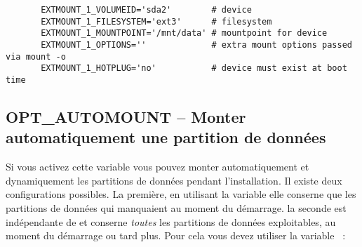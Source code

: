 \begin{example}
\begin{verbatim}
       EXTMOUNT_1_VOLUMEID='sda2'        # device
       EXTMOUNT_1_FILESYSTEM='ext3'      # filesystem
       EXTMOUNT_1_MOUNTPOINT='/mnt/data' # mountpoint for device
       EXTMOUNT_1_OPTIONS=''             # extra mount options passed via mount -o
       EXTMOUNT_1_HOTPLUG='no'           # device must exist at boot time
\end{verbatim}
\end{example}


\subsection {OPT\_AUTOMOUNT -- Monter automatiquement une partition de données}

    Si vous activez cette variable  vous pouvez monter
	automatiquement et dynamiquement les partitions de données pendant l'installation.
	Il existe deux configurations possibles. La première, en utilisant la variable
	 elle conserne que les partitions de données qui manquaient
	au moment du démarrage. la seconde est indépendante de  et
	conserne \emph{toutes} les partitions de données exploitables, au moment du
	démarrage ou tard plus. Pour cela vous devez utiliser la variable
	~:

